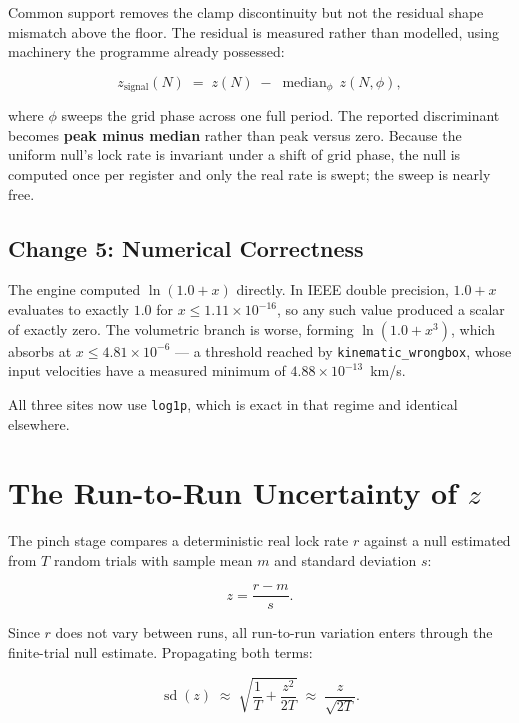 \documentclass[11pt, letterpaper, openany]{book}
\begin{document}
Common support removes the clamp discontinuity but not the residual shape mismatch above the
floor. The residual is measured rather than modelled, using machinery the programme already
possessed:

\begin{equation}
z_{\text{signal}}(N) \;=\; z(N) \;-\; \operatorname{median}_{\phi}\, z(N, \phi),
\end{equation}

\noindent where $\phi$ sweeps the grid phase across one full period. The reported discriminant
becomes \textbf{peak minus median} rather than peak versus zero. Because the uniform null's
lock rate is invariant under a shift of grid phase, the null is computed once per register and
only the real rate is swept; the sweep is nearly free.

\subsection{Change 5: Numerical Correctness}

The engine computed $\ln(1.0 + x)$ directly. In IEEE double precision, $1.0 + x$ evaluates to
exactly $1.0$ for $x \leq 1.11 \times 10^{-16}$, so any such value produced a scalar of exactly
zero. The volumetric branch is worse, forming $\ln(1.0 + x^3)$, which absorbs at
$x \leq 4.81 \times 10^{-6}$ --- a threshold reached by \texttt{kinematic\_wrongbox}, whose
input velocities have a measured minimum of $4.88 \times 10^{-13}$~km/s.

All three sites now use \texttt{log1p}, which is exact in that regime and identical elsewhere.

\section{The Run-to-Run Uncertainty of $z$}

The pinch stage compares a deterministic real lock rate $r$ against a null estimated from $T$
random trials with sample mean $m$ and standard deviation $s$:

\[
z = \frac{r-m}{s}.
\]

Since $r$ does not vary between runs, all run-to-run variation enters through the finite-trial
null estimate. Propagating both terms:

\begin{equation}
\operatorname{sd}(z) \;\approx\; \sqrt{\frac{1}{T} + \frac{z^{2}}{2T}} \;\approx\; \frac{z}{\sqrt{2T}} .
\label{eq:sdz}
\end{equation}
\end{document}
